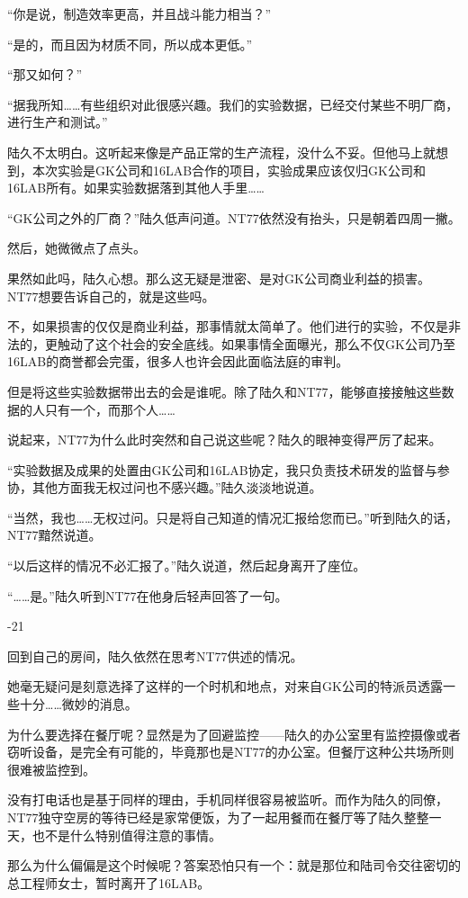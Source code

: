 “你是说，制造效率更高，并且战斗能力相当？”

“是的，而且因为材质不同，所以成本更低。”

“那又如何？”

“据我所知……有些组织对此很感兴趣。我们的实验数据，已经交付某些不明厂商，进行生产和测试。”

陆久不太明白。这听起来像是产品正常的生产流程，没什么不妥。但他马上就想到，本次实验是GK公司和16LAB合作的项目，实验成果应该仅归GK公司和16LAB所有。如果实验数据落到其他人手里……

“GK公司之外的厂商？”陆久低声问道。NT77依然没有抬头，只是朝着四周一撇。

然后，她微微点了点头。

果然如此吗，陆久心想。那么这无疑是泄密、是对GK公司商业利益的损害。NT77想要告诉自己的，就是这些吗。

不，如果损害的仅仅是商业利益，那事情就太简单了。他们进行的实验，不仅是非法的，更触动了这个社会的安全底线。如果事情全面曝光，那么不仅GK公司乃至16LAB的商誉都会完蛋，很多人也许会因此面临法庭的审判。

但是将这些实验数据带出去的会是谁呢。除了陆久和NT77，能够直接接触这些数据的人只有一个，而那个人……

说起来，NT77为什么此时突然和自己说这些呢？陆久的眼神变得严厉了起来。

“实验数据及成果的处置由GK公司和16LAB协定，我只负责技术研发的监督与参协，其他方面我无权过问也不感兴趣。”陆久淡淡地说道。

“当然，我也……无权过问。只是将自己知道的情况汇报给您而已。”听到陆久的话，NT77黯然说道。

“以后这样的情况不必汇报了。”陆久说道，然后起身离开了座位。

“……是。”陆久听到NT77在他身后轻声回答了一句。



-21

回到自己的房间，陆久依然在思考NT77供述的情况。

她毫无疑问是刻意选择了这样的一个时机和地点，对来自GK公司的特派员透露一些十分……微妙的消息。

为什么要选择在餐厅呢？显然是为了回避监控——陆久的办公室里有监控摄像或者窃听设备，是完全有可能的，毕竟那也是NT77的办公室。但餐厅这种公共场所则很难被监控到。

没有打电话也是基于同样的理由，手机同样很容易被监听。而作为陆久的同僚，NT77独守空房的等待已经是家常便饭，为了一起用餐而在餐厅等了陆久整整一天，也不是什么特别值得注意的事情。

那么为什么偏偏是这个时候呢？答案恐怕只有一个：就是那位和陆司令交往密切的总工程师女士，暂时离开了16LAB。

